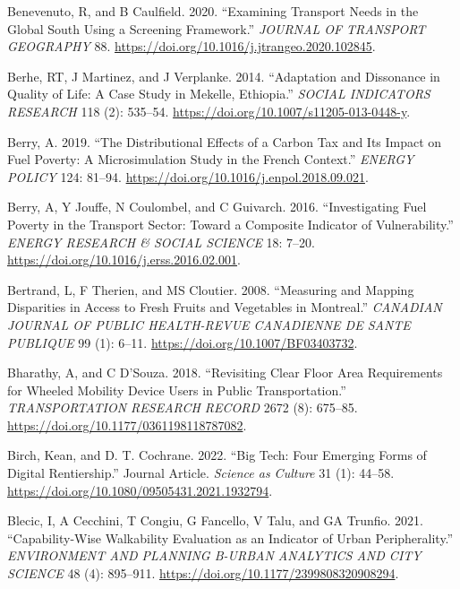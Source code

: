 \documentclass[12pt, oneside]{report}
\newlength{\cslhangindent}
\newlength{\cslentryspacingunit} %
\newenvironment{CSLReferences}[2] %
 {%
  \setlength{\parindent}{0pt}
  \ifodd #1
  \let\oldpar\par
  \def\par{\hangindent=\cslhangindent\oldpar}
  \fi
  \setlength{\parskip}{#2\cslentryspacingunit}
 }%
 {}
\begin{document}
\begin{CSLReferences}{1}{0}
\leavevmode{}%
Benevenuto, R, and B Caulfield. 2020. {``Examining Transport Needs in
the Global South Using a Screening Framework.''} \emph{JOURNAL OF
TRANSPORT GEOGRAPHY} 88.
\url{https://doi.org/10.1016/j.jtrangeo.2020.102845}.

\leavevmode{}%
Berhe, RT, J Martinez, and J Verplanke. 2014. {``Adaptation and
{Dissonance} in {Quality} of {Life}: {A Case Study} in {Mekelle},
{Ethiopia}.''} \emph{SOCIAL INDICATORS RESEARCH} 118 (2): 535--54.
\url{https://doi.org/10.1007/s11205-013-0448-y}.

\leavevmode{}%
Berry, A. 2019. {``The Distributional Effects of a Carbon Tax and Its
Impact on Fuel Poverty: {A} Microsimulation Study in the {French}
Context.''} \emph{ENERGY POLICY} 124: 81--94.
\url{https://doi.org/10.1016/j.enpol.2018.09.021}.

\leavevmode{}%
Berry, A, Y Jouffe, N Coulombel, and C Guivarch. 2016. {``Investigating
Fuel Poverty in the Transport Sector: {Toward} a Composite Indicator of
Vulnerability.''} \emph{ENERGY RESEARCH \& SOCIAL SCIENCE} 18: 7--20.
\url{https://doi.org/10.1016/j.erss.2016.02.001}.

\leavevmode{}%
Bertrand, L, F Therien, and MS Cloutier. 2008. {``Measuring and Mapping
Disparities in Access to Fresh Fruits and Vegetables in {Montreal}.''}
\emph{CANADIAN JOURNAL OF PUBLIC HEALTH-REVUE CANADIENNE DE SANTE
PUBLIQUE} 99 (1): 6--11. \url{https://doi.org/10.1007/BF03403732}.

\leavevmode{}%
Bharathy, A, and C D'Souza. 2018. {``Revisiting {Clear Floor Area
Requirements} for {Wheeled Mobility Device Users} in {Public
Transportation}.''} \emph{TRANSPORTATION RESEARCH RECORD} 2672 (8):
675--85. \url{https://doi.org/10.1177/0361198118787082}.

\leavevmode{}%
Birch, Kean, and D. T. Cochrane. 2022. {``Big Tech: Four Emerging Forms
of Digital Rentiership.''} Journal Article. \emph{Science as Culture} 31
(1): 44--58. \url{https://doi.org/10.1080/09505431.2021.1932794}.

\leavevmode{}%
Blecic, I, A Cecchini, T Congiu, G Fancello, V Talu, and GA Trunfio.
2021. {``Capability-Wise Walkability Evaluation as an Indicator of Urban
Peripherality.''} \emph{ENVIRONMENT AND PLANNING B-URBAN ANALYTICS AND
CITY SCIENCE} 48 (4): 895--911.
\url{https://doi.org/10.1177/2399808320908294}.


\end{CSLReferences}
\end{document}
